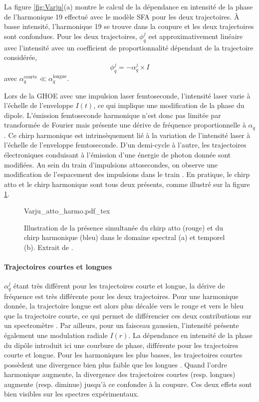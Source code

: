 La figure \ref{fig:Varju}(a) montre le calcul de la dépendance en intensité de la phase de l'harmonique 19 effectué avec le modèle SFA pour les deux trajectoires. \`{A} basse intensité, l'harmonique 19 se trouve dans la coupure et les deux trajectoires sont confondues. Pour les deux trajectoires, $\phi_q^j$ est approximativement linéaire avec l'intensité avec un coefficient de proportionnalité dépendant de la trajectoire considérée,
\begin{equation}
\phi_q^j = - \alpha_q^j \times I
\end{equation}
avec $\alpha_q^{\text{courte}} \ll \alpha_q^{\text{longue}}$. 

Lors de la GHOE avec une impulsion laser femtoseconde, l'intensité laser varie à l'échelle de l'enveloppe $I(t)$, ce qui implique une modification de la phase du dipole. L'émission femtoseconde harmonique n'est donc pas limitée par transformée de Fourier mais présente une dérive de fréquence proportionnelle à $\alpha_q$ . Ce chirp harmonique est intrinsèquement lié à la variation de l'intensité laser à l'échelle de l'enveloppe femtoseconde. D'un demi-cycle à l'autre, les trajectoires électroniques conduisant à l'émission d'une énergie de photon donnée sont modifiées. Au sein du train d'impulsions attosecondes, on observe une modification de l'espacement des impulsions dans le train . En pratique, le chirp atto et le chirp harmonique sont tous deux présents, comme illustré sur la figure \ref{fig:Varju_atto_harmo}.

\begin{figure}
\centering
\def\svgwidth{0.5\columnwidth}
{Varju_atto_harmo.pdf_tex}
\caption{Illustration de la présence simultanée du chirp atto (rouge) et du chirp harmonique (bleu) dans le domaine spectral (a) et temporel (b). Extrait de .}
\label{fig:Varju_atto_harmo}
\end{figure}

\paragraph{Trajectoires courtes et longues} $\alpha_q^j$ étant très différent pour les trajectoires courte et longue, la dérive de fréquence est très différente pour les deux trajectoires. Pour une harmonique donnée, la trajectoire longue est alors plus décalée vers le rouge et vers le bleu que la trajectoire courte, ce qui permet de différencier ces deux contributions sur un spectromètre . Par ailleurs, pour un faisceau gaussien, l'intensité présente également une modulation radiale $I(r)$. La dépendance en intensité de la phase du dipôle introduit ici une courbure de phase, différente pour les trajectoires courte et longue. Pour les harmoniques les plus basses, les trajectoires courtes possèdent une divergence bien plus faible que les longues . Quand l'ordre harmonique augmente, la divergence des trajectoires courtes (resp. longues) augmente (resp. diminue) jusqu'à ce confondre à la coupure. Ces deux effets sont bien visibles sur les spectres expérimentaux.

